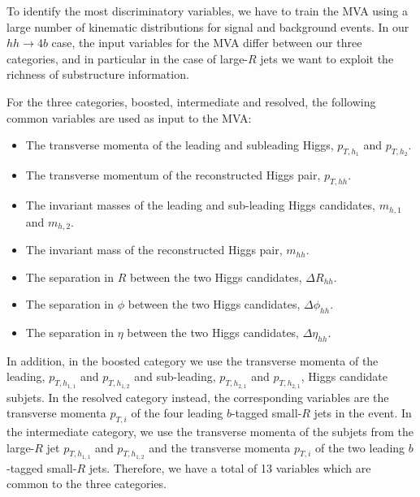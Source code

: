  To identify the most discriminatory variables, we have to train
 the MVA using a large number of kinematic distributions for
 signal and background events.
%
In our $hh\to 4b$ case,
the input variables for the MVA differ between our three categories,
and in particular in the case of large-$R$ jets we want to exploit
the richness of substructure information.

For the three categories, boosted, intermediate and resolved,
the following common variables are used as input to the MVA:
\begin{itemize}
\item The transverse momenta of the leading and subleading Higgs, $p_{T,h_1}$ and $p_{T,h_2}$.
\item The transverse momentum of the reconstructed Higgs pair, $p_{T,hh}$.
\item The invariant masses of the leading and sub-leading Higgs candidates, $m_{h,1}$ and $m_{h,2}$.
\item The invariant mass of the reconstructed Higgs pair, $m_{hh}$.
\item The separation in $R$ between the two Higgs candidates, $\Delta R_{hh}$.
\item The separation in $\phi$  between the two Higgs candidates, $\Delta \phi_{hh}$.
\item The separation in $\eta$  between the two Higgs candidates, $\Delta \eta_{hh}$.
\end{itemize}
In addition, in the boosted category we use
  the transverse momenta of the leading, $p_{T,h_{1,1}}$ and $p_{T,h_{1,2}}$ and
  sub-leading, $p_{T,h_{2,1}}$ and $p_{T,h_{2,1}}$, Higgs candidate subjets.
  In the resolved category instead,
  the corresponding variables are
  the transverse momenta $p_{T,i}$ of the four leading 
  $b$-tagged small-$R$ jets in the event.
  In the intermediate category, we use the
  transverse momenta of the subjets
  from the large-$R$ jet $p_{T,h_{1,1}}$ and $p_{T,h_{1,2}}$ and the
 transverse momenta $p_{T,i}$ of the two leading 
  $b$-tagged small-$R$ jets.
Therefore, we have a total of 13 variables which are common to the three categories.
%



